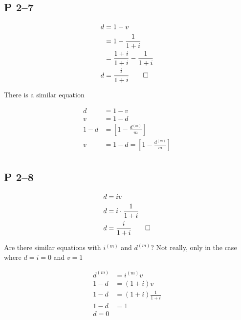 \documentclass[a4paper, 12pt, reqno]{amsart}
\numberwithin{equation}{section}
\begin{document}
\subsection*{P 2--7}

\begin{equation}\nonumber
    \begin{aligned}
        d &= 1-v                \\
         &= 1 - \frac{1}{1+i}   \\
         &= \frac{1+i}{1+i} - \frac{1}{1+i}    \\
        d &= \frac{i}{1+i}  \qed
    \end{aligned}
\end{equation}

There is a similar equation

\begin{equation}\nonumber
    \begin{aligned}
        d &= 1-v                \\
        v &= 1-d                \\
        1-d &= \left[ 1 - \frac{d^{(m)}}{m} \right] \\
        v &= 1-d = \left[ 1 - \frac{d^{(m)}}{m} \right] \\
    \end{aligned}
\end{equation}

\subsection*{P 2--8}

\begin{equation}\nonumber
    \begin{aligned}
        d &= iv                         \\
        d &= i \cdot \frac{1}{1+i}      \\
        d &= \frac{i}{1+i}  \qed
    \end{aligned}
\end{equation}

Are there similar equations with $i^{(m)}$ and $d^{(m)}$? Not really, only in
the case where $d = i = 0$ and $v=1$

\begin{equation}\nonumber
    \begin{aligned}
        d^{(m)} &= i^{(m)}v                         \\
        1-d &= (1+i)v                         \\
        1-d &= (1+i) \frac{1}{1+i}          \\
        1-d &= 1        \\
        d = 0
    \end{aligned}
\end{equation}
\end{document}
